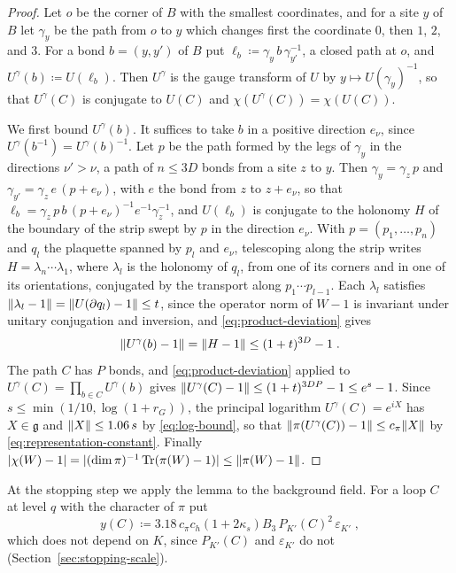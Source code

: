 \documentclass[11pt]{preprint}
\DeclarePairedDelimiter{\abs}{\lvert}{\rvert}
\DeclarePairedDelimiter{\norm}{\lVert}{\rVert}
\numberwithin{equation}{section}
\theoremstyle{definition}
\theoremstyle{remark}
\theoremstyle{plain}
\begin{document}
\begin{proof}
Let $o$ be the corner of $B$ with the smallest coordinates, and for a site $y$ of $B$ let $\gamma_y$ be the path from $o$ to $y$ which changes first the coordinate $0$, then $1$, $2$, and $3$. For a bond $b = (y, y')$ of $B$ put $\ell_b \coloneqq \gamma_y\,b\,\gamma_{y'}^{-1}$, a closed path at $o$, and $U^\gamma(b) \coloneqq U(\ell_b)$. Then $U^\gamma$ is the gauge transform of $U$ by $y \mapsto U(\gamma_y)^{-1}$, so that $U^\gamma(C)$ is conjugate to $U(C)$ and $\chi(U^\gamma(C)) = \chi(U(C))$.

We first bound $U^\gamma(b)$. It suffices to take $b$ in a positive direction $e_\nu$, since $U^\gamma(b^{-1}) = U^\gamma(b)^{-1}$. Let $p$ be the path formed by the legs of $\gamma_y$ in the directions $\nu' > \nu$, a path of $n \leq 3D$ bonds from a site $z$ to $y$. Then $\gamma_y = \gamma_z\,p$ and $\gamma_{y'} = \gamma_z\,e\,(p + e_\nu)$, with $e$ the bond from $z$ to $z + e_\nu$, so that $\ell_b = \gamma_z\,p\,b\,(p + e_\nu)^{-1}e^{-1}\gamma_z^{-1}$, and $U(\ell_b)$ is conjugate to the holonomy $H$ of the boundary of the strip swept by $p$ in the direction $e_\nu$. With $p = (p_1, \dots, p_n)$ and $q_l$ the plaquette spanned by $p_l$ and $e_\nu$, telescoping along the strip writes $H = \lambda_n\cdots\lambda_1$, where $\lambda_l$ is the holonomy of $q_l$, from one of its corners and in one of its orientations, conjugated by the transport along $p_1 \cdots p_{l-1}$. Each $\lambda_l$ satisfies $\norm{\lambda_l - 1} = \norm{U(\partial q_l) - 1} \leq t$, since the operator norm of $W - 1$ is invariant under unitary conjugation and inversion, and \eqref{eq:product-deviation} gives
\begin{equation}\label{eq:axial-bond}
    \norm{U^\gamma(b) - 1} = \norm{H - 1} \leq (1 + t)^{3D} - 1\;.
\end{equation}
The path $C$ has $P$ bonds, and \eqref{eq:product-deviation} applied to $U^\gamma(C) = \prod_{b \in C}U^\gamma(b)$ gives $\norm{U^\gamma(C) - 1} \leq (1 + t)^{3DP} - 1 \leq e^s - 1$. Since $s \leq \min(1/10, \log(1 + r_G))$, the principal logarithm $U^\gamma(C) = e^{iX}$ has $X \in \mathfrak g$ and $\norm{X} \leq 1.06\,s$ by \eqref{eq:log-bound}, so that $\norm{\pi(U^\gamma(C)) - 1} \leq c_\pi\norm{X}$ by \eqref{eq:representation-constant}. Finally $\abs{\chi(W) - 1} = \abs{(\dim\pi)^{-1}\operatorname{Tr}(\pi(W) - 1)} \leq \norm{\pi(W) - 1}$.
\end{proof}

At the stopping step we apply the lemma to the background field. For a loop $C$ at level $q$ with the character of $\pi$ put
\begin{equation}\label{eq:flat-loop-constant}
    y(C) \coloneqq 3.18\,c_\pi c_h(1 + 2\kappa_s)B_3\,P_{K'}(C)^2\,\varepsilon_{K'}\;,
\end{equation}
which does not depend on $K$, since $P_{K'}(C)$ and $\varepsilon_{K'}$ do not (Section~\ref{sec:stopping-scale}).
\end{document}
